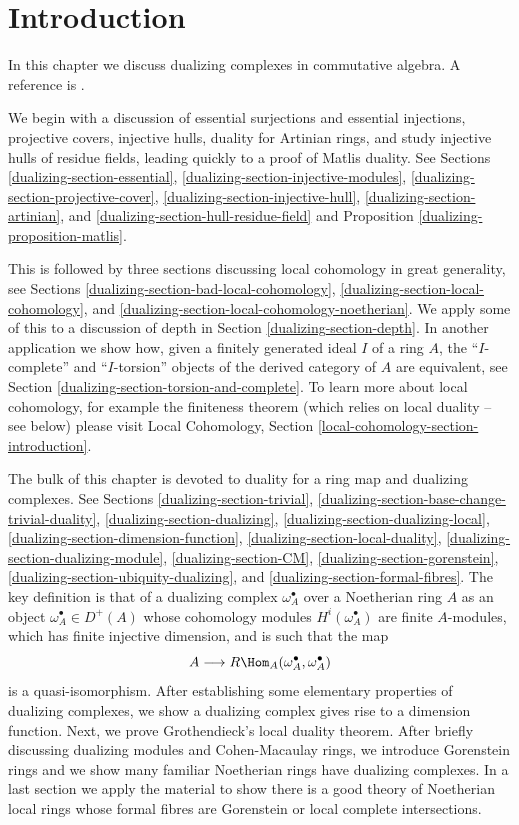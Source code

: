 \section{Introduction}
\label{dualizing-section-introduction}
In this chapter we discuss dualizing complexes in commutative algebra.
A reference is \cite{RD}.

\medskip\noindent
We begin with a discussion of
essential surjections and essential injections,
projective covers,
injective hulls,
duality for Artinian rings, and
study injective hulls of residue fields,
leading quickly to a proof of Matlis duality.
See Sections \ref{dualizing-section-essential},
\ref{dualizing-section-injective-modules},
\ref{dualizing-section-projective-cover},
\ref{dualizing-section-injective-hull},
\ref{dualizing-section-artinian}, and
\ref{dualizing-section-hull-residue-field} and
Proposition \ref{dualizing-proposition-matlis}.

\medskip\noindent
This is followed by three sections discussing local cohomology in
great generality, see Sections \ref{dualizing-section-bad-local-cohomology},
\ref{dualizing-section-local-cohomology}, and \ref{dualizing-section-local-cohomology-noetherian}.
We apply some of this to a discussion of depth in
Section \ref{dualizing-section-depth}. In another application we show how,
given a finitely generated ideal $I$ of a ring $A$, the
``$I$-complete'' and ``$I$-torsion'' objects
of the derived category of $A$ are equivalent, see
Section \ref{dualizing-section-torsion-and-complete}.
To learn more about local cohomology, for example the finiteness
theorem (which relies on local duality -- see below) please visit
Local Cohomology, Section \ref{local-cohomology-section-introduction}.

\medskip\noindent
The bulk of this chapter is devoted to duality for a ring map and
dualizing complexes. See
Sections \ref{dualizing-section-trivial},
\ref{dualizing-section-base-change-trivial-duality},
\ref{dualizing-section-dualizing},
\ref{dualizing-section-dualizing-local},
\ref{dualizing-section-dimension-function},
\ref{dualizing-section-local-duality},
\ref{dualizing-section-dualizing-module},
\ref{dualizing-section-CM},
\ref{dualizing-section-gorenstein},
\ref{dualizing-section-ubiquity-dualizing}, and
\ref{dualizing-section-formal-fibres}.
The key definition is that of a dualizing complex
$\omega_A^\bullet$ over a Noetherian ring $A$ as an object
$\omega_A^\bullet \in D^{+}(A)$ whose cohomology modules
$H^i(\omega_A^\bullet)$ are finite $A$-modules, which has
finite injective dimension, and is such that the map
$$
A \longrightarrow R\Hom_A(\omega_A^\bullet, \omega_A^\bullet)
$$
is a quasi-isomorphism. After establishing some elementary properties
of dualizing complexes, we show a dualizing complex gives rise to a
dimension function. Next, we prove Grothendieck's local duality theorem.
After briefly discussing dualizing modules and Cohen-Macaulay rings,
we introduce Gorenstein rings and we show many familiar Noetherian
rings have dualizing complexes. In a last section we apply the material
to show there is a good theory of Noetherian local rings whose formal fibres
are Gorenstein or local complete intersections.

